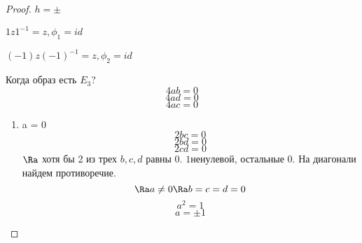 \begin{proof}
$h = \pm$

$1 z 1^{-1} = z, \phi_1 = id$

$(-1)z(-1)^{-1} = z, \phi_2 = id$

Когда образ есть $E_3$?
    $$4ab = 0$$
    $$4ad = 0$$
    $$4ac = 0$$
    \begin{enumerate}
    \item a = 0
    $$2bc = 0$$
    $$2bd = 0 $$
    $$2cd =0 $$
    $\Ra $ хотя бы 2 из трех $b, c, d$ равны 0.
    $1 ненулевой$, остальные 0. На диагонали найдем противоречие. 
    $$\Ra a \ne 0 \Ra b = c = d = 0$$
    $$a^2 = 1$$
    $$a = \pm 1$$
    \end{enumerate}
\end{proof}

